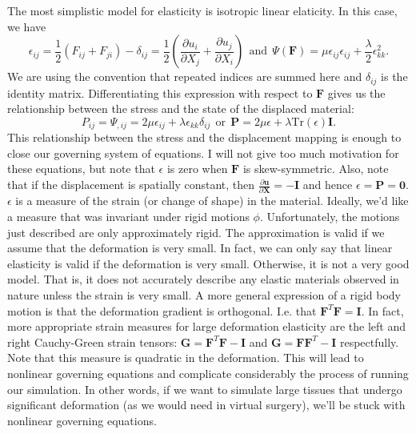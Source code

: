 The most simplistic model for elasticity is isotropic linear elaticity. In this case, we have
$$
\epsilon_{ij}=\frac{1}{2}(F_{ij}+F_{ji})-\delta_{ij}=\frac{1}{2}(\frac{\partial{u}_i}{\partial{X}_j}+\frac{\partial{u}_j}{\partial{X}_i}) \ \ \textrm{and} \ \ \Psi(\mathbf{F})=\mu\epsilon_{ij}\epsilon_{ij}+\frac{\lambda}{2}\epsilon_{kk}^2.
$$
We are using the convention that repeated indices are summed here and $\delta_{ij}$ is the identity matrix. Differentiating this expression with respect to $\mathbf{F}$ gives us the relationship between the stress and the state of the displaced material:
$$
P_{ij}=\Psi_{,ij}=2\mu\epsilon_{ij}+\lambda\epsilon_{kk}\delta_{ij} \ \ \textrm{or} \ \ \mathbf{P}=2\mu\epsilon+\lambda\textrm{Tr}(\epsilon)\mathbf{I}.
$$
This relationship between the stress and the displacement mapping is enough to close our governing system of equations. I will not give too much motivation for these equations, but note that $\epsilon$ is zero when $\mathbf{F}$ is skew-symmetric. Also, note that if the displacement is spatially constant, then $\frac{\partial\mathbf{u}}{\partial\mathbf{X}}=-\mathbf{I}$ and hence $\epsilon=\mathbf{P}=\mathbf{0}$. $\epsilon$ is a measure of the strain (or change of shape) in the material. Ideally, we'd like a measure that was invariant under rigid motions $\phi$. Unfortunately, the motions just described are only approximately rigid. The approximation is valid if we assume that the deformation is very small. In fact, we can only say that linear elasticity is valid if the deformation is very small. Otherwise, it is not a very good model. That is, it does not accurately describe any elastic materials observed in nature unless the strain is very small. A more general expression of a rigid body motion is that the deformation gradient is orthogonal. I.e. that $\mathbf{F}^T\mathbf{F}=\mathbf{I}$. In fact, more appropriate strain measures for large deformation elasticity are the left and right Cauchy-Green strain tensors: $\mathbf{G}=\mathbf{F}^T\mathbf{F}-\mathbf{I}$ and  $\mathbf{G}=\mathbf{F}\mathbf{F}^T-\mathbf{I}$ respectfully. Note that this measure is quadratic in the deformation. This will lead to nonlinear governing equations and complicate considerably the process of running our simulation. In other words, if we want to simulate large tissues that undergo significant deformation (as we would need in virtual surgery), we'll be stuck with nonlinear governing equations.

